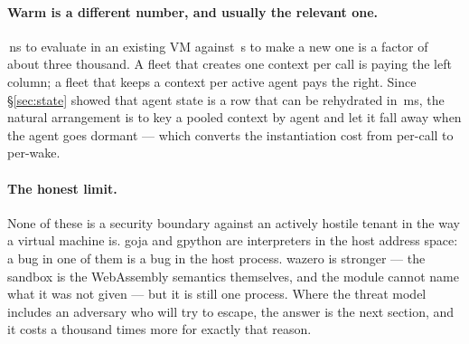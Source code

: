 \paragraph{Warm is a different number, and usually the relevant one.}
\rGojaWarm{}\,ns to evaluate in an existing VM against \rGoja{}\,\textmu s to
make a new one is a factor of about three thousand. A fleet that creates one
context per call is paying the left column; a fleet that keeps a context per
active agent pays the right. Since \S\ref{sec:state} showed that agent state is
a row that can be rehydrated in \rFleetResume{}\,ms, the natural arrangement is
to key a pooled context by agent and let it fall away when the agent goes
dormant --- which converts the instantiation cost from per-call to per-wake.

\paragraph{The honest limit.}
None of these is a security boundary against an actively hostile tenant in the
way a virtual machine is. goja and gpython are interpreters in the host address
space: a bug in one of them is a bug in the host process. wazero is stronger ---
the sandbox is the WebAssembly semantics themselves, and the module cannot name
what it was not given --- but it is still one process. Where the threat model
includes an adversary who will try to escape, the answer is the next section,
and it costs a thousand times more for exactly that reason.
